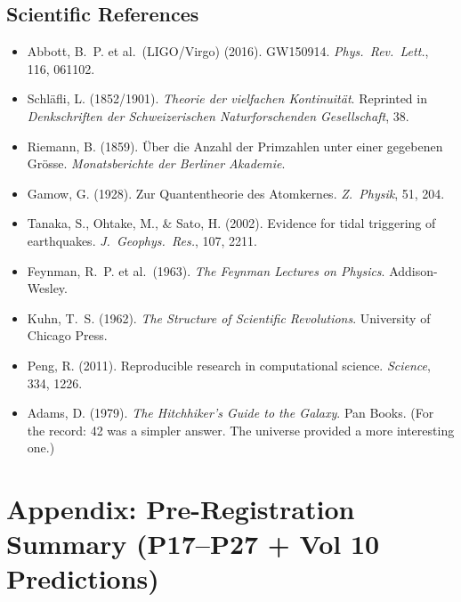 \documentclass[11pt, letterpaper, openany]{book}
\begin{document}
\section*{Scientific References}
\begin{itemize}
    \item Abbott, B.~P. et al.\ (LIGO/Virgo) (2016). GW150914. \textit{Phys.\ Rev.\ Lett.}, 116, 061102.
    \item Schläfli, L. (1852/1901). \textit{Theorie der vielfachen Kontinuität}. Reprinted in \textit{Denkschriften der Schweizerischen Naturforschenden Gesellschaft}, 38.
    \item Riemann, B. (1859). Über die Anzahl der Primzahlen unter einer gegebenen Grösse. \textit{Monatsberichte der Berliner Akademie}.
    \item Gamow, G. (1928). Zur Quantentheorie des Atomkernes. \textit{Z.\ Physik}, 51, 204.
    \item Tanaka, S., Ohtake, M., \& Sato, H. (2002). Evidence for tidal triggering of earthquakes. \textit{J.\ Geophys.\ Res.}, 107, 2211.
    \item Feynman, R.~P. et al.\ (1963). \textit{The Feynman Lectures on Physics}. Addison-Wesley.
    \item Kuhn, T.~S. (1962). \textit{The Structure of Scientific Revolutions}. University of Chicago Press.
    \item Peng, R. (2011). Reproducible research in computational science. \textit{Science}, 334, 1226.
    \item Adams, D. (1979). \textit{The Hitchhiker's Guide to the Galaxy}. Pan Books.
        (For the record: 42 was a simpler answer. The universe provided a more interesting one.)
\end{itemize}

\clearpage

\chapter*{Appendix: Pre-Registration Summary (P17--P27 + Vol 10 Predictions)}
\end{document}
